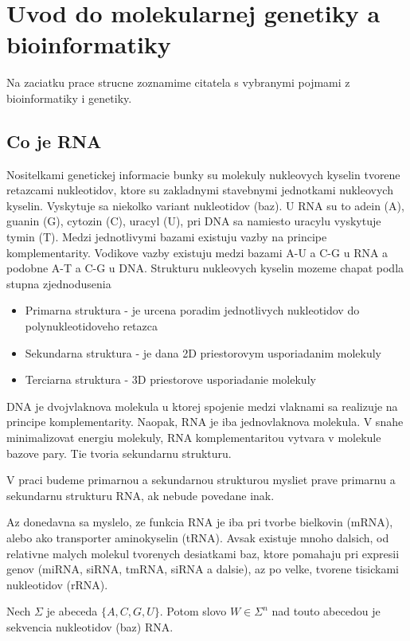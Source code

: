 \renewcommand{\SS}{\mathbb{S}}
\newcommand{\Par}[2]{\mbox{$( #1, #2 )$}}

\chapter{Uvod do molekularnej genetiky a bioinformatiky}

Na zaciatku prace strucne zoznamime citatela s vybranymi pojmami
z bioinformatiky i genetiky.

\section{Co je RNA}

Nositelkami genetickej informacie bunky su molekuly nukleovych kyselin
tvorene retazcami nukleotidov, ktore su zakladnymi stavebnymi jednotkami
nukleovych kyselin. Vyskytuje sa niekolko variant nukleotidov (baz). U RNA su to
adein (A), guanin (G), cytozin (C), uracyl (U),
pri DNA sa namiesto uracylu vyskytuje tymin (T).
Medzi jednotlivymi bazami existuju vazby na principe komplementarity.
Vodikove vazby existuju medzi bazami A-U a C-G u RNA a podobne A-T a C-G u DNA.
Strukturu nukleovych kyselin mozeme chapat podla stupna zjednodusenia
\begin{itemize}
	\item Primarna struktura - je urcena poradim jednotlivych nukleotidov
		do polynukleotidoveho retazca
	\item Sekundarna struktura - je dana 2D priestorovym usporiadanim molekuly
	\item Terciarna struktura - 3D priestorove usporiadanie molekuly
\end{itemize}
DNA je dvojvlaknova molekula u ktorej spojenie medzi vlaknami sa realizuje na principe
komplementarity.
Naopak, RNA je iba jednovlaknova molekula. V snahe minimalizovat energiu molekuly,
RNA komplementaritou vytvara v molekule bazove pary. Tie tvoria sekundarnu strukturu.

V praci budeme primarnou a sekundarnou strukturou mysliet prave primarnu a sekundarnu
strukturu RNA, ak nebude povedane inak.

Az donedavna sa myslelo, ze funkcia RNA je iba pri tvorbe bielkovin (mRNA), alebo
ako transporter aminokyselin (tRNA). Avsak existuje mnoho dalsich, od relativne
malych molekul tvorenych desiatkami baz, ktore pomahaju pri expresii genov
(miRNA, siRNA, tmRNA, siRNA a dalsie), az po velke, tvorene tisickami nukleotidov (rRNA).

\begin{definice}\label{def:RNA_primarna_struktura}
	Nech $\Sigma$ je abeceda $\{A, C, G, U\}$. Potom slovo $W \in \Sigma^n$ nad touto abecedou
	je sekvencia nukleotidov (baz) RNA.
\end{definice}

